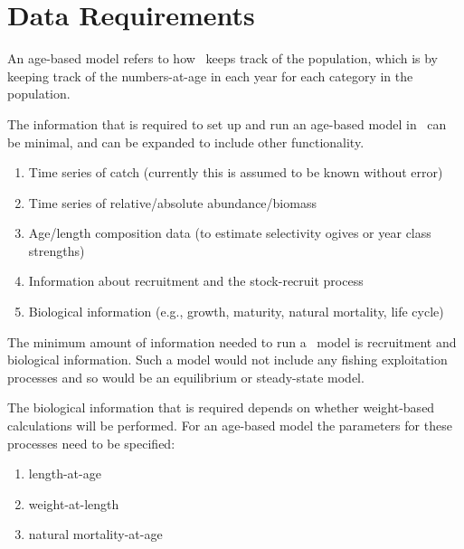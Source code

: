\section{Data Requirements}\label{sec:data_requirements}

 An age-based model refers to how \CNAME\ keeps track of the population, which is by keeping track of the numbers-at-age in each year for each category in the population.

The information that is required to set up and run an age-based model in \CNAME\ can be minimal, and can be expanded to include other functionality.

\begin{enumerate}
	\item Time series of catch (currently this is assumed to be known without error)
	\item Time series of relative/absolute abundance/biomass
	\item Age/length composition data (to estimate selectivity ogives or year class strengths)
	\item Information about recruitment and the stock-recruit process
	\item Biological information (e.g., growth, maturity, natural mortality, life cycle)
\end{enumerate}

The minimum amount of information needed to run a \CNAME\ model is recruitment and biological information. Such a model would not include any fishing exploitation processes and so would be an equilibrium or steady-state model.

The biological information that is required depends on whether weight-based calculations will be performed. For an age-based model the parameters for these processes need to be specified:

\begin{enumerate}
	\item length-at-age 
	\item weight-at-length 
	\item natural mortality-at-age 
\end{enumerate}

